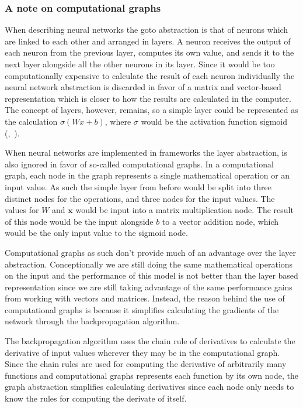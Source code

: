 \subsubsection*{A note on computational graphs}

When describing neural networks the goto abstraction is that of neurons which
are linked to each other and arranged in layers. A neuron receives the output of
each neuron from the previous layer, computes its own value, and sends it to the
next layer alongside all the other neurons in its layer. Since it would be too
computationally expensive to calculate the result of each neuron individually
the neural network abstraction is discarded in favor of a matrix and
vector-based representation which is closer to how the results are calculated in
the computer. The concept of layers, however, remains, so a simple layer could be
represented as the calculation $\sigma(W x + b)$, where $\sigma$
would be the activation function sigmoid
(\cite[Chapter~6.5.1]{goodfellow2016deep},~\cite[Chapter~5.1]{goldberg2017neural}).

When neural networks are implemented in frameworks the layer abstraction, is also
ignored in favor of so-called computational graphs. In a computational graph,
each node in the graph represents a single mathematical operation or an input
value. As such the simple layer from before would be split into three distinct
nodes for the operations, and three nodes for the input values. The values for
$W$ and $\bm{x}$ would be input into a matrix multiplication node. The result of
this node would be the input alongside $b$ to a vector addition node, which
would be the only input value to the sigmoid node.


Computational graphs as such don't provide much of an advantage over the layer
abstraction. Conceptionally we are still doing the same mathematical operations
on the input and the performance of this model is not better than the layer based
representation since we are still taking advantage of the same performance
gains from working with vectors and matrices. Instead, the reason behind the use
of computational graphs is because it simplifies calculating the gradients of
the network through the backpropagation algorithm. 

The backpropagation algorithm uses the chain rule of derivatives to calculate
the derivative of input values wherever they may be in the computational graph.
Since the chain rules are used for computing the derivative of arbitrarily many
functions and computational graphs represents each function by its own node,
the graph abstraction simplifies calculating derivatives since each node only
needs to know the rules for computing the derivate of itself.
 

